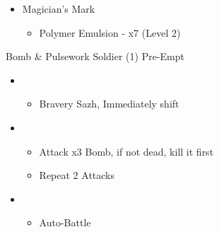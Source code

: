 \begin{multicols}{2}
\begin{upgrade}
\begin{itemize}
\begin{itemize}
\begin{itemize}
\begin{itemize}
						                  \item Cie'th Tear/Tear of Frustration x3
						                  \item Thickened Hide - All (Level 2, 1.75/2x EXP)
						                  \item \textit{If it's not at 2x EXP, keep using organics}
						                  \item Polymer Emulsion - x27 (*)
					                  \end{itemize}
					            \item Magician's Mark
					                  \begin{itemize}
						                  \item Polymer Emulsion - x7 (Level 2)
					                  \end{itemize}
				            \end{itemize}
			      \end{itemize}
		\end{itemize}
	\end{upgrade}

	\begin{battle}[0:19]{Bomb \& Pulsework Soldier (1) Pre-Empt}
		\begin{itemize}
			\item \second
			      \begin{itemize}
				      \item Bravery Sazh, Immediately shift
			      \end{itemize}
			\item \third
			      \begin{itemize}
				      \item Attack x3 Bomb, if not dead, kill it first
				      \item Repeat 2  Attacks
			      \end{itemize}
			\item \first
			      \begin{itemize}
				      \item Auto-Battle
			      \end{itemize}
		\end{itemize}
	\end{battle}


\end{multicols}
